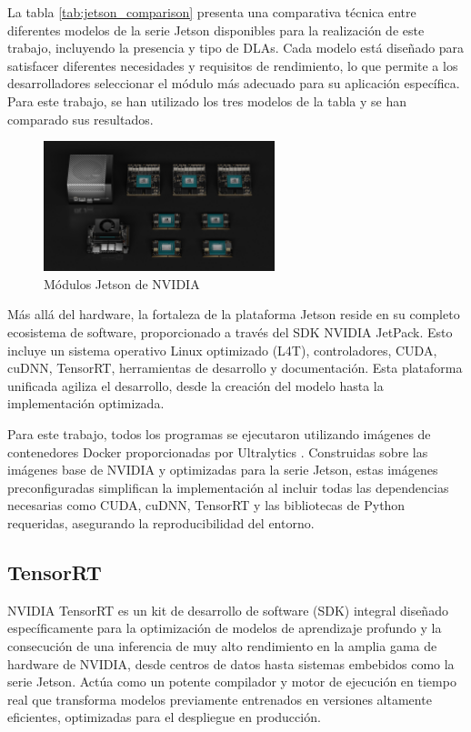 \documentclass[11pt,spanish,listoffigures,listoftables]{tfgetsinf}
\begin{document}
La tabla \ref{tab:jetson_comparison}\cite{nvidia_jetson_modules} presenta una comparativa técnica entre diferentes modelos de la serie Jetson disponibles para la realización de este trabajo, incluyendo la presencia y tipo de DLAs. Cada modelo está diseñado para satisfacer diferentes necesidades y requisitos de rendimiento, lo que permite a los desarrolladores seleccionar el módulo más adecuado para su aplicación específica. Para este trabajo, se han utilizado los tres modelos de la tabla y se han comparado sus resultados.


\begin{figure}[H]
   \centering
   \includegraphics[width=0.6\textwidth]{images/estado_del_arte/jetson_family.png}
   \caption[Módulos Jetson de NVIDIA]{Módulos Jetson de NVIDIA}
   \label{fig:jetson_modules}
\end{figure}


Más allá del hardware, la fortaleza de la plataforma Jetson reside en su completo ecosistema de software, proporcionado a través del SDK NVIDIA JetPack. Esto incluye un sistema operativo Linux optimizado (L4T), controladores, CUDA, cuDNN, TensorRT, herramientas de desarrollo y documentación. Esta plataforma unificada agiliza el desarrollo, desde la creación del modelo hasta la implementación optimizada.

Para este trabajo, todos los programas se ejecutaron utilizando imágenes de contenedores Docker proporcionadas por Ultralytics \cite{ultralytics_docker_quickstart}. Construidas sobre las imágenes base de NVIDIA y optimizadas para la serie Jetson, estas imágenes preconfiguradas simplifican la implementación al incluir todas las dependencias necesarias como CUDA, cuDNN, TensorRT y las bibliotecas de Python requeridas, asegurando la reproducibilidad del entorno.

\subsection{TensorRT} \label{sec:tensorrt}
NVIDIA TensorRT es un kit de desarrollo de software (SDK) integral diseñado específicamente para la optimización de modelos de aprendizaje profundo y la consecución de una inferencia de muy alto rendimiento en la amplia gama de hardware de NVIDIA, desde centros de datos hasta sistemas embebidos como la serie Jetson. Actúa como un potente compilador y motor de ejecución en tiempo real que transforma modelos previamente entrenados en versiones altamente eficientes, optimizadas para el despliegue en producción.
\end{document}
